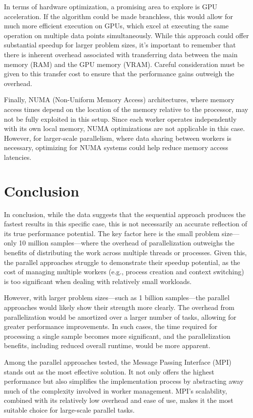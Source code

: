 \documentclass[a4paper, oneside]{article}
\begin{document}
In terms of hardware optimization, a promising area to explore is GPU acceleration. If the algorithm could be made branchless, this would allow for much more efficient execution on GPUs, which excel at executing the same operation on multiple data points simultaneously. While this approach could offer substantial speedup for larger problem sizes, it's important to remember that there is inherent overhead associated with transferring data between the main memory (RAM) and the GPU memory (VRAM). Careful consideration must be given to this transfer cost to ensure that the performance gains outweigh the overhead.

Finally, NUMA (Non-Uniform Memory Access) architectures, where memory access times depend on the location of the memory relative to the processor, may not be fully exploited in this setup. Since each worker operates independently with its own local memory, NUMA optimizations are not applicable in this case. However, for larger-scale parallelism, where data sharing between workers is necessary, optimizing for NUMA systems could help reduce memory access latencies.


\section{Conclusion}
In conclusion, while the data suggests that the sequential approach produces the fastest results in this specific case, this is not necessarily an accurate reflection of its true performance potential. The key factor here is the small problem size—only 10 million samples—where the overhead of parallelization outweighs the benefits of distributing the work across multiple threads or processes. Given this, the parallel approaches struggle to demonstrate their speedup potential, as the cost of managing multiple workers (e.g., process creation and context switching) is too significant when dealing with relatively small workloads.

However, with larger problem sizes—such as 1 billion samples—the parallel approaches would likely show their strength more clearly. The overhead from parallelization would be amortized over a larger number of tasks, allowing for greater performance improvements. In such cases, the time required for processing a single sample becomes more significant, and the parallelization benefits, including reduced overall runtime, would be more apparent.

Among the parallel approaches tested, the Message Passing Interface (MPI) stands out as the most effective solution. It not only offers the highest performance but also simplifies the implementation process by abstracting away much of the complexity involved in worker management. MPI's scalability, combined with its relatively low overhead and ease of use, makes it the most suitable choice for large-scale parallel tasks.
\end{document}
